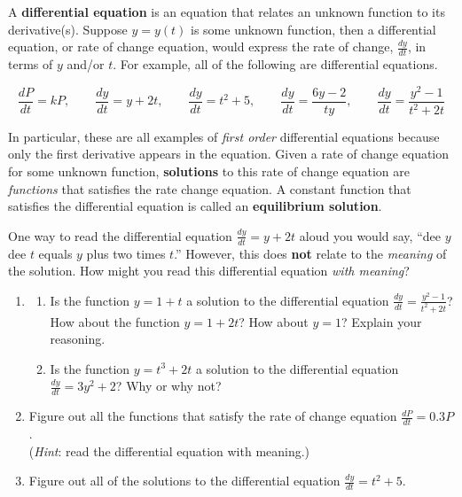 \clearpage
 

A {\bf differential equation} is an equation that relates an unknown function to its derivative(s). Suppose $y = y(t)$ is some unknown function, then a differential equation, or rate of change equation, would express the rate of change, $\frac{dy}{dt}$, in terms of $y$ and/or $t$. For example, all of the following are differential equations.  

\[ \frac{dP}{dt}=kP,\qquad \frac{dy}{dt}=y+2t, \qquad \frac{dy}{dt}=t^2+5,\qquad \frac{dy}{dt}=\frac{6y-2}{ty}, \qquad \frac{dy}{dt}=\frac{y^2-1}{t^2+2t}
\]

In particular, these are all examples of \textit{first order} differential equations because only the first derivative appears in the equation. Given a rate of change equation for some unknown function, \textbf{solutions} to this rate of change equation are \textsl{functions} that satisfies the rate change equation. A constant function that satisfies the differential equation is called an \textbf{equilibrium solution}.
\vs

One way to read the differential equation $\frac{dy}{dt} = y+2t$ aloud you would say, ``dee $y$ dee $t$ equals $y$ plus two times $t$.'' However, this does \textbf{not} relate to the \textsl{meaning} of the solution.  How might you read this differential equation \textsl{with meaning}?

\begin{enumerate}[resume]
\item \begin{enumerate}
\item Is the function $y=1+t$  a solution to the differential equation $\displaystyle\frac{dy}{dt}=\frac{y^2-1}{t^2+2t}$? How about the function $y=1+2t$?  How about $y = 1$?  Explain your reasoning. \label{01problem4parta} \vfill 

\item	Is the function $y=t^3+2t$    a solution to the differential equation $\displaystyle \frac{dy}{dt}=3y^2+2$?  Why or why not? \label{01problem4partb} \vfill

\end{enumerate}

\item	Figure out all the functions that satisfy the rate of change equation $\displaystyle \frac{dP}{dt}=0.3P$. \\(\textsl{Hint}: read the differential equation with meaning.) \label{01problem5} \vfill

\item	Figure out all of the solutions to the differential equation $\displaystyle\frac{dy}{dt}=t^2+5$. \label{01problem6} \vfill
\end{enumerate}

